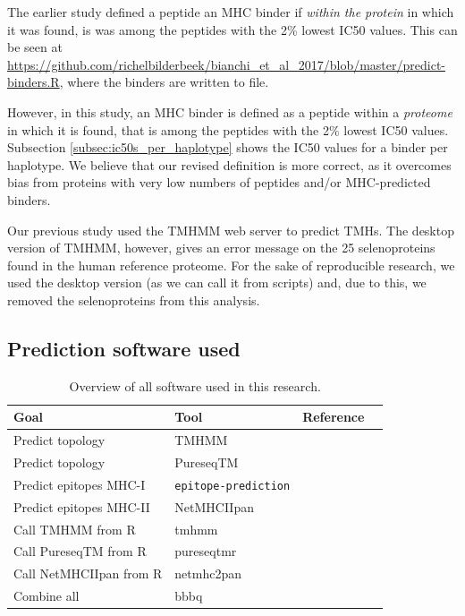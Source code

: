 The earlier study defined a peptide an MHC binder 
if \emph{within the protein} in which it was found, 
is was among the peptides with the 2\% lowest IC50 values.
This can be seen at \url{https://github.com/richelbilderbeek/bianchi_et_al_2017/blob/master/predict-binders.R},
where the binders are written to file.

However, in this study, an MHC binder is defined as a peptide within a \emph{proteome} in which it is found, that is among the peptides with the 2\% lowest IC50 values.
Subsection \ref{subsec:ic50s_per_haplotype} shows the IC50 values
for a binder per haplotype. We believe that our revised definition is more correct, as it overcomes bias from proteins with very low numbers of peptides and/or MHC-predicted binders.


Our previous study used the TMHMM web server
to predict TMHs.
The desktop version of TMHMM, however, gives an
error message on the 25 selenoproteins found in the human
reference proteome.
For the sake of reproducible research, we used the desktop version (as
we can call it from scripts) and, due to this, we removed the
selenoproteins from this analysis.

\subsection{Prediction software used}
\label{subsec:prediction_software_used}

\begin{table}[]
  \begin{tabular}{llll}
    Goal & Tool & Reference \\ 
    \hline
    Predict topology                  & TMHMM                     & \cite{krogh2001predicting} \\
    Predict topology                  & PureseqTM                 & \cite{wang2019efficient} \\
    Predict epitopes MHC-I            & \verb;epitope-prediction; & \cite{bianchi2017} \\
    Predict epitopes MHC-II           & NetMHCIIpan               & \cite{nielsen2008quantitative,karosiene2013netmhciipan} \\
    Call TMHMM from R                 & tmhmm                     & \cite{tmhmm} \\
    Call PureseqTM from R             & pureseqtmr                & \cite{pureseqtmr} \\
    Call NetMHCIIpan from R           & netmhc2pan                & \cite{netmhc2pan} \\
    Combine all                       & bbbq                      & \cite{bbbq}
  \end{tabular}
  \caption{
    Overview of all software used in this research.
  }
  \label{table:software_used}
\end{table}


